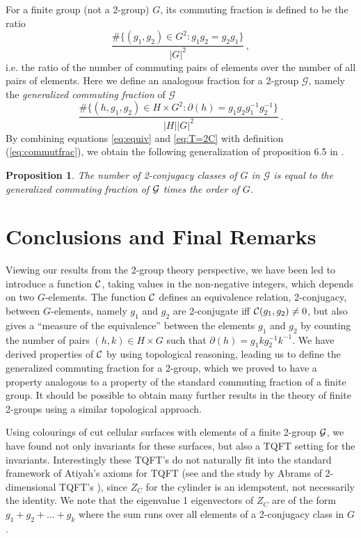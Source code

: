 \documentclass[a4paper,11pt]{article}
\newtheorem{Proposition}[Theorem]{Proposition}
\def \G {\mathcal{G}}
\begin{document}
For a finite group (not a 2-group) $G$, its commuting fraction is defined to be the ratio 
$$
\frac{\#\{(g_1,g_2) \in G^2 : g_1 g_2 = g_2 g_1 \}}{|G|^2} \, ,
$$
i.e. the ratio of the number of commuting pairs of elements over the number of all pairs of elements.
Here we define an analogous fraction for a 2-group $\G$, namely the \emph{generalized commuting fraction}  of $\G$
\begin{equation}
\label{eq:commutfrac}
\frac{\#\{(h,g_1,g_2) \in H \times G^2 : \partial(h)=g_1 g_2 g_1^{-1} g_2^{-1}\}}{|H| |G|^2} \,.
\end{equation}
By combining  equations \eqref{eq:equiv} and \eqref{eq:T=2C} with definition (\ref{eq:commutfrac}), we obtain the following generalization of proposition 6.5 in \cite{bp1}.
\begin{Proposition}
The number of 2-conjugacy classes of $G$ in $\G$ is equal to the generalized commuting fraction of $\cal G$ times the order of $G$.
\label{prop:gcf}
\end{Proposition}



\section{Conclusions and Final Remarks}
\label{sec:conc}

Viewing our results from the 2-group theory perspective, we have been led to introduce a function $\cal C$, taking values in the non-negative integers, which depends on two $G$-elements. The function $\cal C$ defines an equivalence relation, 2-conjugacy, between $G$-elements, namely $g_1$ and $g_2$ are 2-conjugate iff ${\cal C}(g_1,g_2)\neq 0$, but also gives a ``measure of the equivalence'' between the elements $g_1$ and $g_2$ by counting the number of pairs $(h,k) \in H \times G$ such that $\partial(h) = g_1 k g_2^{-1} k^{-1}$. We have derived properties of $\cal C$ by using topological reasoning, leading us to define the  generalized commuting fraction for a 2-group, which we proved to have a property analogous to a property of the standard commuting fraction of a finite group. It should be possible to obtain many further results in the theory of finite 2-groups using a similar topological approach. 

Using colourings of cut cellular surfaces with elements of a finite 2-group $\cal G$,  we have found not only invariants for these surfaces, but also a TQFT setting for the invariants. Interestingly these TQFT's do not naturally fit into the standard framework of Atiyah's axioms for TQFT (see \cite{at}  and the study by Abrams of 2-dimensional TQFT's \cite{ab}), since $Z_{ C}$ for the cylinder is an idempotent, not necessarily the identity. We note that the eigenvalue 1 eigenvectors of $Z_{C}$ are of the form $g_1 + g_2 + \dots + g_k$ where the sum runs over all elements of a 2-conjugacy class in $G$. 
\end{document}
